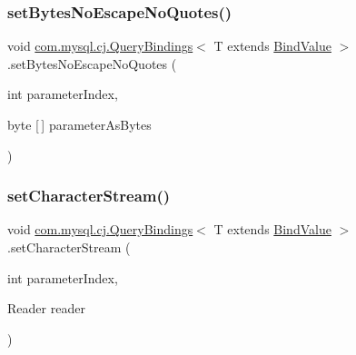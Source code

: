 \subsubsection{\texorpdfstring{set\+Bytes\+No\+Escape\+No\+Quotes()}{setBytesNoEscapeNoQuotes()}}
{\footnotesize\ttfamily void \mbox{\hyperlink{interfacecom_1_1mysql_1_1cj_1_1_query_bindings}{com.\+mysql.\+cj.\+Query\+Bindings}}$<$ T extends \mbox{\hyperlink{interfacecom_1_1mysql_1_1cj_1_1_bind_value}{Bind\+Value}} $>$.set\+Bytes\+No\+Escape\+No\+Quotes (\begin{DoxyParamCaption}\item[{int}]{parameter\+Index,  }\item[{byte \mbox{[}$\,$\mbox{]}}]{parameter\+As\+Bytes }\end{DoxyParamCaption})}

\mbox{\label{interfacecom_1_1mysql_1_1cj_1_1_query_bindings_a9a8a5478dc70771dc426208803ca9b91}} 
\subsubsection{\texorpdfstring{set\+Character\+Stream()}{setCharacterStream()}\hspace{0.1cm}{\footnotesize\ttfamily [1/3]}}
{\footnotesize\ttfamily void \mbox{\hyperlink{interfacecom_1_1mysql_1_1cj_1_1_query_bindings}{com.\+mysql.\+cj.\+Query\+Bindings}}$<$ T extends \mbox{\hyperlink{interfacecom_1_1mysql_1_1cj_1_1_bind_value}{Bind\+Value}} $>$.set\+Character\+Stream (\begin{DoxyParamCaption}\item[{int}]{parameter\+Index,  }\item[{Reader}]{reader }\end{DoxyParamCaption})}

\mbox{\label{interfacecom_1_1mysql_1_1cj_1_1_query_bindings_a0f1c2e28ff5e3e383b224d033019957b}} 

